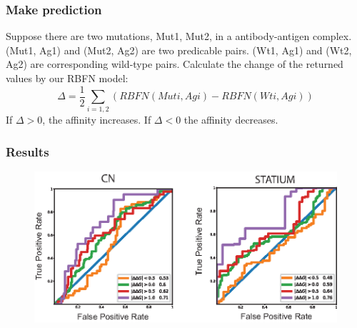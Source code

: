 \documentclass[hyperref={pdfpagelabels=false}]{beamer}
\begin{document}
\begin{frame}
\frametitle{Make prediction}
Suppose there are two mutations, Mut1, Mut2, in a antibody-antigen complex. (Mut1, Ag1) and (Mut2, Ag2) are two predicable pairs. (Wt1, Ag1) and (Wt2, Ag2) are corresponding wild-type pairs. Calculate the change of the returned values by our RBFN model:
$$\Delta = \frac{1}{2}\sum\limits_{i=1,2} \left(RBFN(Muti, Agi)-RBFN(Wti, Agi)\right)$$
If $\Delta > 0$, the affinity increases. If $\Delta <0$ the affinity decreases.

\end{frame}

\begin{frame}
\frametitle{Results}
\begin{figure}
	\centering
	\includegraphics[scale=0.8]{CNStatium.eps}
\end{figure}
\end{frame}
\end{document}
